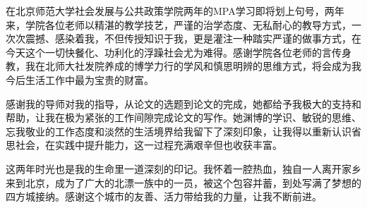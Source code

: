 
\begin{ack}
在北京师范大学社会发展与公共政策学院两年的MPA学习即将划上句号，两年来，学院各位老师以精湛的教学技艺，严谨的治学态度、无私耐心的教导方式，一次次震撼、感染着我，不但传授知识于我，更是灌注一种踏实严谨的做事方式，在今天这个一切快餐化、功利化的浮躁社会尤为难得。感谢学院各位老师的言传身教，我在北师大社发院养成的博学力行的学风和慎思明辨的思维方式，将会成为我今后生活工作中最为宝贵的财富。

感谢我的导师对我的指导，从论文的选题到论文的完成，她都给予我极大的支持和帮助，让我在极为紧张的工作间隙完成论文的写作。她渊博的学识、敏锐的思维、忘我敬业的工作态度和淡然的生活境界给我留下了深刻印象，让我得以重新认识省思社会，在实践中提升能力，这一过程充满艰辛但也收获丰富。

这两年时光也是我的生命里一道深刻的印记。我怀着一腔热血，独自一人离开家乡来到北京，成为了广大的北漂一族中的一员，被这个包容并蓄，到处写满了梦想的四方城接纳。感谢这个城市的友善、活力带给我的力量，让我不断前进。

\end{ack}
